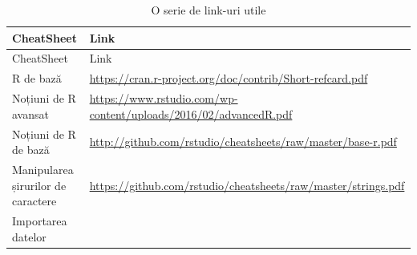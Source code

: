 \documentclass[]{article}
\begin{document}
\begin{longtable}[]{@{}ll@{}}
\caption{O serie de link-uri utile}\tabularnewline
\toprule
\begin{minipage}[b]{0.32\columnwidth}\raggedright
CheatSheet\strut
\end{minipage} & \begin{minipage}[b]{0.62\columnwidth}\raggedright
Link\strut
\end{minipage}\tabularnewline
\midrule
\endfirsthead
\toprule
\begin{minipage}[b]{0.32\columnwidth}\raggedright
CheatSheet\strut
\end{minipage} & \begin{minipage}[b]{0.62\columnwidth}\raggedright
Link\strut
\end{minipage}\tabularnewline
\midrule
\endhead
\begin{minipage}[t]{0.32\columnwidth}\raggedright
R de bază\strut
\end{minipage} & \begin{minipage}[t]{0.62\columnwidth}\raggedright
\url{https://cran.r-project.org/doc/contrib/Short-refcard.pdf}\strut
\end{minipage}\tabularnewline
\begin{minipage}[t]{0.32\columnwidth}\raggedright
Noțiuni de R avansat\strut
\end{minipage} & \begin{minipage}[t]{0.62\columnwidth}\raggedright
\url{https://www.rstudio.com/wp-content/uploads/2016/02/advancedR.pdf}\strut
\end{minipage}\tabularnewline
\begin{minipage}[t]{0.32\columnwidth}\raggedright
Noțiuni de R de bază\strut
\end{minipage} & \begin{minipage}[t]{0.62\columnwidth}\raggedright
\url{http://github.com/rstudio/cheatsheets/raw/master/base-r.pdf}\strut
\end{minipage}\tabularnewline
\begin{minipage}[t]{0.32\columnwidth}\raggedright
Manipularea șirurilor de caractere\strut
\end{minipage} & \begin{minipage}[t]{0.62\columnwidth}\raggedright
\url{https://github.com/rstudio/cheatsheets/raw/master/strings.pdf}\strut
\end{minipage}\tabularnewline
\begin{minipage}[t]{0.32\columnwidth}\raggedright
Importarea datelor\strut
\end{minipage} & \begin{minipage}[t]{0.62\columnwidth}\raggedright

\end{minipage}
\end{longtable}
\end{document}
